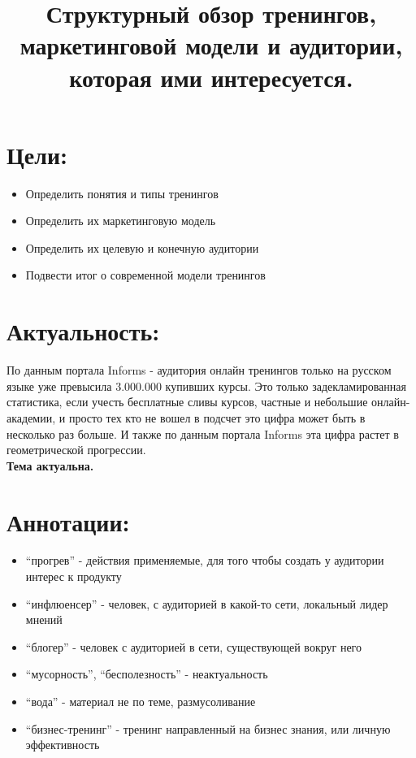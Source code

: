 \documentclass{article}
\title{\textbf{Структурный обзор тренингов, маркетинговой модели и аудитории, которая ими интересуется.}}
\begin{document}
\maketitle
\newpage
\tableofcontents


\section{Цели:}
\begin{itemize} 
\item Определить понятия и типы тренингов
\item Определить их маркетинговую модель
\item Определить их целевую и конечную аудитории
\item Подвести итог о современной модели тренингов
\end{itemize}

\section{Актуальность:}
По данным портала Informs - аудитория онлайн тренингов только на русском языке уже превысила 3.000.000 купивших курсы. Это только задекламированная статистика, если учесть бесплатные сливы курсов, частные и небольшие онлайн-академии, и просто тех кто не вошел в подсчет это цифра может быть в несколько раз больше. И также по данным портала Informs эта цифра растет в геометрической прогрессии. \\
\textbf{Тема актуальна.}

\newpage

\section{Аннотации:}
\begin{itemize} 
\item “прогрев” - действия применяемые, для того чтобы создать у аудитории интерес к продукту
\item “инфлюенсер” - человек, с аудиторией в какой-то сети, локальный лидер мнений
\item “блогер” - человек с аудиторией в сети, существующей вокруг него
\item “мусорность”, “бесполезность” - неактуальность
\item “вода” - материал не по теме, размусоливание
\item “бизнес-тренинг” - тренинг направленный на бизнес знания, или личную эффективность
\end{itemize}
\end{document}
